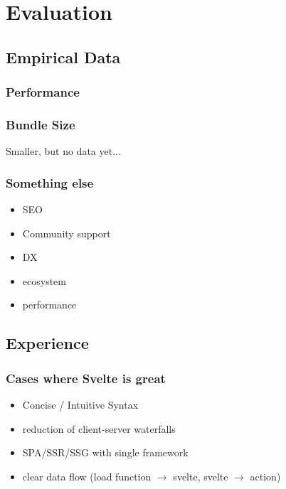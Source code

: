 \chapter{Evaluation}

\section{Empirical Data}

\subsection{Performance}

\subsection{Bundle Size}

Smaller, but no data yet...

\subsection{Something else}

\begin{itemize}
    \item SEO
    \item Community support
    \item DX
    \item ecosystem
    \item performance
\end{itemize}


\section{Experience}

\subsection{Cases where Svelte is great}

\begin{itemize}
    \item Concise / Intuitive Syntax
    \item reduction of client-server waterfalls
    \item SPA/SSR/SSG with single framework
    \item clear data flow (load function $\rightarrow$ svelte, svelte $\rightarrow$ action)
\end{itemize}

